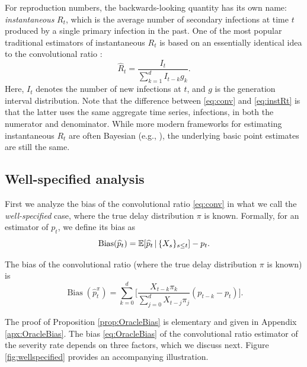 \documentclass{article}
\renewcommand{\hat}{\widehat} %
\newcommand{\given}{\, \vert \,}
\DeclareMathOperator{\bias}{Bias}
\begin{document}
For reproduction numbers, the backwards-looking quantity has its own name:
\emph{instantaneous} $R_t$, which is the average number of secondary infections
at time $t$ produced by a single primary infection in the past. One of the most
popular traditional estimators of instantaneous $R_t$ is based on an essentially 
identical idea to the convolutional ratio \citep{fraser2007, wallinga2007how}: 
\begin{equation}
\label{eq:instRt}
\hat{R}_t = \frac{I_t}{\sum_{k=1}^d I_{t-k} g_k}.
\end{equation}
Here, $I_t$ denotes the number of new infections at $t$, and $g$ is the
generation interval distribution. Note that the difference between
\eqref{eq:conv} and \eqref{eq:instRt} is that the latter uses the same aggregate 
time series, infections, in both the numerator and denominator. While more
modern frameworks for estimating instantaneous $R_t$ are often Bayesian (e.g.,
\citealp{cori2013new}), the underlying basic point estimates are still the same.

\subsection{Well-specified analysis}\label{sec:ws_analysis}

First we analyze the bias of the convolutional ratio \eqref{eq:conv} in what we  
call the \emph{well-specified} case, where the true delay distribution $\pi$ is 
known. Formally, for an estimator \smash{$\hat{p}_t$} of $p_t$, we define its
bias as     
\[
\bias(\hat{p}_t) = \E[\hat{p}_t \given \{X_s\}_{s\leq t}] - p_t. 
\]

\begin{proposition}
\label{prop:OracleBias}
The bias of the convolutional ratio \smash{$\hat{p}_t^\pi$} (where the true
delay distribution $\pi$ is known) is 
\begin{equation}
\label{eq:OracleBias}
\bias(\hat{p}_t^\pi)  = \sum_{k=0}^d \Bigg[ \frac{X_{t-k}\pi_k}{\sum_{j=0}^d
  X_{t-j}\pi_j} (p_{t-k}-p_t) \Bigg]. 
\end{equation}
\end{proposition}
The proof of Proposition \ref{prop:OracleBias} is elementary and given in
Appendix \ref{apx:OracleBias}. The bias \eqref{eq:OracleBias} of the
convolutional ratio estimator of the severity rate depends on three factors,
which we discuss next. Figure \ref{fig:wellspecified} provides an accompanying
illustration.     
\end{document}
